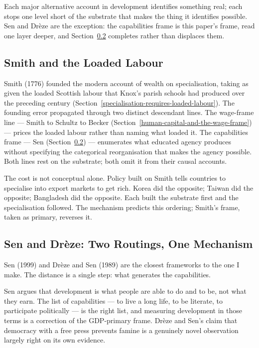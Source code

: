 \documentclass[12pt,letterpaper]{article}
\begin{document}
{\renewcommand{\thetable}{A\arabic{table}}%
\setcounter{table}{4}


Each major alternative account in development identifies something real; each stops one level short of the substrate that makes the thing it identifies possible. Sen and Drèze are the exception: the capabilities frame is this paper's frame, read one layer deeper, and Section~\ref{sen-and-dreze-two-routings} completes rather than displaces them.

\subsection{Smith and the Loaded Labour}\label{smith-and-the-loaded-labour}

Smith (1776) founded the modern account of wealth on specialisation, taking as given the loaded Scottish labour that Knox's parish schools had produced over the preceding century (Section~\ref{specialisation-requires-loaded-labour}). The founding error propagated through two distinct descendant lines. The wage-frame line --- Smith to Schultz to Becker (Section~\ref{human-capital-and-the-wage-frame}) --- prices the loaded labour rather than naming what loaded it. The capabilities frame --- Sen (Section~\ref{sen-and-dreze-two-routings}) --- enumerates what educated agency produces without specifying the categorical reorganisation that makes the agency possible. Both lines rest on the substrate; both omit it from their causal accounts.

The cost is not conceptual alone. Policy built on Smith tells countries to specialise into export markets to get rich. Korea did the opposite; Taiwan did the opposite; Bangladesh did the opposite. Each built the substrate first and the specialisation followed. The mechanism predicts this ordering; Smith's frame, taken as primary, reverses it.

\subsection{Sen and Drèze: Two Routings, One Mechanism}\label{sen-and-dreze-two-routings}

Sen (1999) and Drèze and Sen (1989) are the closest frameworks to the one I make. The distance is a single step: what generates the capabilities.

Sen argues that development is what people are able to do and to be, not what they earn. The list of capabilities --- to live a long life, to be literate, to participate politically --- is the right list, and measuring development in those terms is a correction of the GDP-primary frame. Drèze and Sen's claim that democracy with a free press prevents famine is a genuinely novel observation largely right on its own evidence.

}
\end{document}
